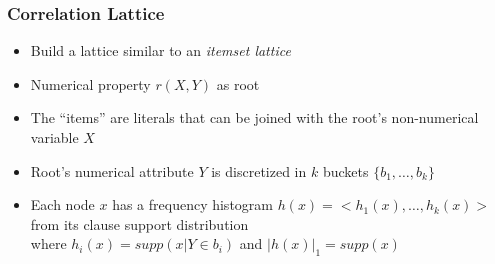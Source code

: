 \documentclass{beamer}
\begin{document}
\begin{frame}
\frametitle{Correlation Lattice}
  \begin{itemize}
   \item Build a lattice similar to an \emph{itemset lattice}
   \item Numerical property $r(X,Y)$ as root 
   \item The ``items'' are literals that can be joined with the root's non-numerical variable $X$
   \item Root's numerical attribute $Y$ is discretized in $k$ buckets $\{b_1,\dots,b_k\}$
   \item Each node $x$ has a frequency histogram $h(x)=<h_1(x),\ldots,h_k(x)>$ from its clause support distribution \\
      \quad where $h_i(x)=supp(x|Y \in b_i)$ \quad and \quad $|h(x)|_1=supp(x)$
  \end{itemize}
\end{frame}
\end{document}
